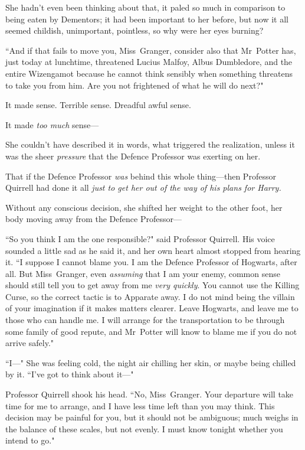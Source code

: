 She hadn't even been thinking about that, it paled so much in comparison to being eaten by Dementors; it had been important to her before, but now it all seemed childish, unimportant, pointless, so why were her eyes burning?

``And if that fails to move you, Miss~Granger, consider also that Mr~Potter has, just today at lunchtime, threatened Lucius Malfoy, Albus Dumbledore, and the entire Wizengamot because he cannot think sensibly when something threatens to take you from him. Are you not frightened of what he will do next?"

It made sense. Terrible sense. Dreadful awful sense.

It made \emph{too much} sense—

She couldn't have described it in words, what triggered the realization, unless it was the sheer \emph{pressure} that the Defence Professor was exerting on her.

That if the Defence Professor \emph{was} behind this whole thing—then Professor Quirrell had done it all \emph{just to get her out of the way of his plans for Harry.}

Without any conscious decision, she shifted her weight to the other foot, her body moving away from the Defence Professor—

``So you think I am the one responsible?" said Professor Quirrell. His voice sounded a little sad as he said it, and her own heart almost stopped from hearing it. ``I suppose I cannot blame you. I am the Defence Professor of Hogwarts, after all. But Miss~Granger, even \emph{assuming} that I am your enemy, common sense should still tell you to get away from me \emph{very quickly}. You cannot use the Killing Curse, so the correct tactic is to Apparate away. I do not mind being the villain of your imagination if it makes matters clearer. Leave Hogwarts, and leave me to those who can handle me. I will arrange for the transportation to be through some family of good repute, and Mr~Potter will know to blame me if you do not arrive safely."

``I—" She was feeling cold, the night air chilling her skin, or maybe being chilled by it. ``I've got to think about it—"

Professor Quirrell shook his head. ``No, Miss~Granger. Your departure will take time for me to arrange, and I have less time left than you may think. This decision may be painful for you, but it should not be ambiguous; much weighs in the balance of these scales, but not evenly. I must know tonight whether you intend to go."


